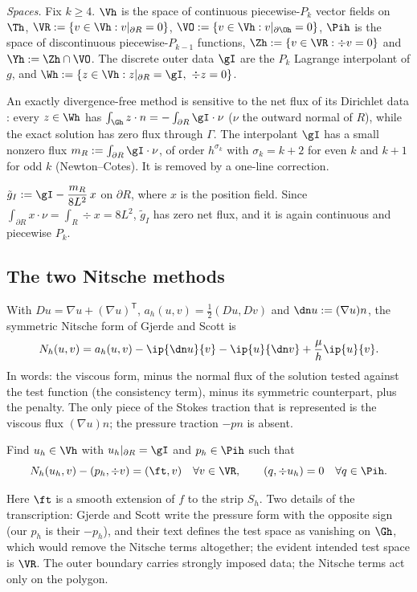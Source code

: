 \emph{Spaces.} Fix $k\ge4$. $\Vh$ is the space of continuous piecewise-$P_k$ vector fields on $\Th$, $\VR:=\{v\in\Vh:v|_{\partial R}=0\}$, $\VO:=\{v\in\Vh:v|_{\partial\Oh}=0\}$, $\Pih$ is the space of discontinuous piecewise-$P_{k-1}$ functions, $\Zh:=\{v\in\VR:\div v=0\}$ and $\Yh:=\Zh\cap\VO$. The discrete outer data $\gI$ are the $P_k$ Lagrange interpolant of $g$, and $\Wh:=\{z\in\Vh:z|_{\partial R}=\gI,\ \div z=0\}$.

An exactly divergence-free method is sensitive to the net flux of its Dirichlet data \cite{EickmannScottTscherpel2025}: every $z\in\Wh$ has $\int_{\Gh}z\cdot n=-\int_{\partial R}\gI\cdot\nu$ ($\nu$ the outward normal of $R$), while the exact solution has zero flux through $\Gamma$. The interpolant $\gI$ has a small nonzero flux $m_R:=\int_{\partial R}\gI\cdot\nu$, of order $h^{\sigma_k}$ with $\sigma_k=k+2$ for even $k$ and $k+1$ for odd $k$ (Newton--Cotes). It is removed by a one-line correction.

\begin{definition}\label{def:flux}
$\tilde g_I:=\gI-\dfrac{m_R}{8L^2}\,x$ on $\partial R$, where $x$ is the position field. Since $\int_{\partial R}x\cdot\nu=\int_R\div x=8L^2$, $\tilde g_I$ has zero net flux, and it is again continuous and piecewise $P_k$.
\end{definition}

\subsection{The two Nitsche methods}
With $Du=\nabla u+(\nabla u)^{\mathsf T}$, $a_h(u,v)=\frac12(Du,Dv)$ and $\dn u:=(\nabla u)n$, the symmetric Nitsche form of Gjerde and Scott is
\[
N_h(u,v)=a_h(u,v)-\ip{\dn u}{v}-\ip{u}{\dn v}+\frac{\mu}{h}\ip{u}{v}.
\]
In words: the viscous form, minus the normal flux of the solution tested against the test function (the consistency term), minus its symmetric counterpart, plus the penalty. The only piece of the Stokes traction that is represented is the viscous flux $(\nabla u)n$; the pressure traction $-pn$ is absent.

\begin{definition}
Find $u_h\in\Vh$ with $u_h|_{\partial R}=\gI$ and $p_h\in\Pih$ such that
\[
N_h(u_h,v)-(p_h,\div v)=(\ft,v)\quad\forall v\in\VR,\qquad (q,\div u_h)=0\quad\forall q\in\Pih.
\]
\end{definition}
Here $\ft$ is a smooth extension of $f$ to the strip $S_h$. Two details of the transcription: Gjerde and Scott write the pressure form with the opposite sign (our $p_h$ is their $-p_h$), and their text defines the test space as vanishing on $\Gh$, which would remove the Nitsche terms altogether; the evident intended test space is $\VR$. The outer boundary carries strongly imposed data; the Nitsche terms act only on the polygon.

